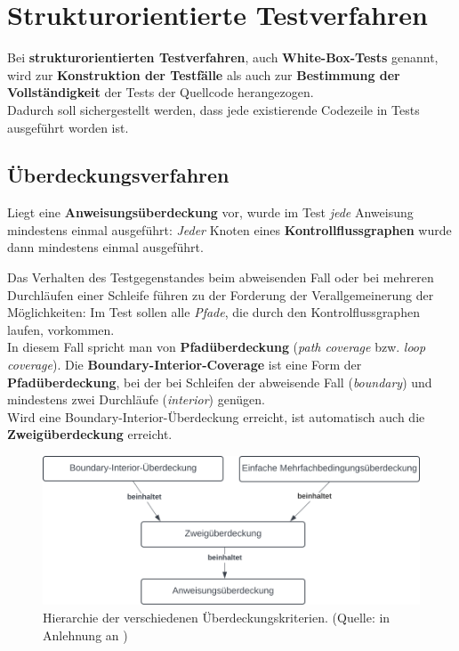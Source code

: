 \section{Strukturorientierte Testverfahren}

\begin{tcolorbox}
    Bei \textbf{strukturorientierten Testverfahren}, auch \textbf{White-Box-Tests} genannt, wird zur \textbf{Konstruktion der Testfälle} als auch zur \textbf{Bestimmung der Vollständigkeit} der Tests der Quellcode herangezogen.\\
    Dadurch soll sichergestellt werden, dass jede existierende Codezeile in Tests ausgeführt worden ist.
\end{tcolorbox}


\subsection*{Überdeckungsverfahren}

\begin{tcolorbox}[title=Anweisungsüberdeckung]
    Liegt eine \textbf{Anweisungsüberdeckung} vor, wurde im Test \textit{jede} Anweisung mindestens einmal ausgeführt: \textit{Jeder} Knoten eines \textbf{Kontrollflussgraphen} wurde dann mindestens einmal ausgeführt.
\end{tcolorbox}



\begin{tcolorbox}[title=Boundary-Interior-Coverage]
    Das Verhalten des Testgegenstandes beim abweisenden Fall oder bei mehreren Durchläufen einer Schleife führen zu der Forderung der Verallgemeinerung der Möglichkeiten: Im Test sollen alle \textit{Pfade}, die durch den Kontrolflussgraphen laufen, vorkommen.\\
    In diesem Fall spricht man von \textbf{Pfadüberdeckung} (\textit{path coverage} bzw. \textit{loop coverage}).
    Die \textbf{Boundary-Interior-Coverage} ist eine Form der \textbf{Pfadüberdeckung}, bei der bei Schleifen der abweisende Fall (\textit{boundary}) und mindestens zwei Durchläufe (\textit{interior}) genügen.\\
    Wird eine Boundary-Interior-Überdeckung erreicht, ist automatisch auch die \textbf{Zweigüberdeckung} erreicht.
\end{tcolorbox}


\begin{figure}
    \centering
    \includegraphics[scale=0.4]{part four/Testende Verfahren/img/coverage-criteria-hierarchy}
    \caption{Hierarchie der verschiedenen Überdeckungskriterien. (Quelle: in Anlehnung an \cite[Abb. 5.2, 53]{Wed09c})}
    \label{fig:coverage-criteria-hierarchy-cc}
\end{figure}